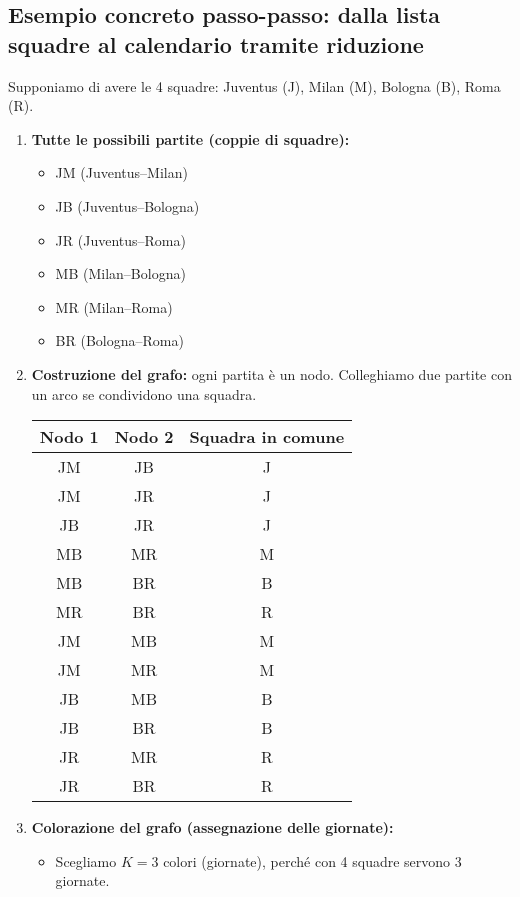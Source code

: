 \documentclass[a4paper]{article}
\theoremstyle{definition} %
\begin{document}
\subsection*{Esempio concreto passo-passo: dalla lista squadre al calendario tramite riduzione}
Supponiamo di avere le 4 squadre: Juventus (J), Milan (M), Bologna (B), Roma (R).

\begin{enumerate}
    \item \textbf{Tutte le possibili partite (coppie di squadre):}
    \begin{itemize}
        \item JM (Juventus--Milan)
        \item JB (Juventus--Bologna)
        \item JR (Juventus--Roma)
        \item MB (Milan--Bologna)
        \item MR (Milan--Roma)
        \item BR (Bologna--Roma)
    \end{itemize}
    \item \textbf{Costruzione del grafo:} ogni partita è un nodo. Colleghiamo due partite con un arco se condividono una squadra.
    \begin{center}
    \begin{tabular}{|c|c|c|}
        \hline
        Nodo 1 & Nodo 2 & Squadra in comune \\
        \hline
        JM & JB & J \\
        JM & JR & J \\
        JB & JR & J \\
        MB & MR & M \\
        MB & BR & B \\
        MR & BR & R \\
        JM & MB & M \\
        JM & MR & M \\
        JB & MB & B \\
        JB & BR & B \\
        JR & MR & R \\
        JR & BR & R \\
        \hline
    \end{tabular}
    \end{center}
    \item \textbf{Colorazione del grafo (assegnazione delle giornate):}
    \begin{itemize}
        \item Scegliamo $K = 3$ colori (giornate), perché con 4 squadre servono 3 giornate.

\end{itemize}
\end{enumerate}
\end{document}
